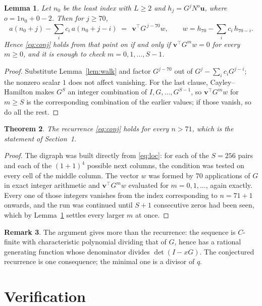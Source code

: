\documentclass[11pt,a4paper]{article}
\theoremstyle{plain}
\newtheorem{theorem}{Theorem}
\newtheorem{lemma}[theorem]{Lemma}
\theoremstyle{definition}
\newtheorem{remark}[theorem]{Remark}
\begin{document}
\begin{lemma}\label{lem:crit}
Let $n_0$ be the least index with $L\ge2$ and $h_j=G^{j}N^{o}\mathbf{u}$, where
$o=1n_0+0-2$. Then for $j\ge70$,
\[
a(n_0+j)-\sum_i c_i\,a(n_0+j-i)\;=\;\,\mathbf{v}^{\!\top}G^{\,j-70}w,
\qquad w=h_{70}-\sum_i c_i\,h_{70-i} .
\]
Hence \eqref{eq:conj} holds from that point on if and only if
$\mathbf{v}^{\!\top}G^{m}w=0$ for every $m\ge0$, and it is enough to check
$m=0,1,\dots,S-1$.
\end{lemma}

\begin{proof}
Substitute Lemma~\ref{lem:walk} and factor $G^{j-70}$ out of
$G^{j}-\sum_ic_iG^{j-i}$; the nonzero scalar $1$ does not affect
vanishing. For the last clause, Cayley--Hamilton makes $G^{S}$ an integer combination of
$I,G,\dots,G^{S-1}$, so $\mathbf{v}^{\!\top}G^{m}w$ for $m\ge S$ is the corresponding
combination of the earlier values; if those vanish, so do all the rest.
\end{proof}

\begin{theorem}
The recurrence \eqref{eq:conj} holds for every $n>71$, which is the statement of
Section~1.
\end{theorem}

\begin{proof}
The digraph was built directly from \eqref{eq:loc}: for each of the $S=256$ pairs and each
of the $(1+1)^{4}$ possible next columns, the condition was tested on every cell of
the middle column. The vector $w$ was formed by $70$ applications of $G$ in exact integer
arithmetic and $\mathbf{v}^{\!\top}G^{m}w$ evaluated for $m=0,1,\dots$, again exactly.
Every one of those integers vanishes from the index corresponding to $n=71+1$ onwards,
and the run was continued until $S+1$ consecutive zeros had been seen, which by
Lemma~\ref{lem:crit} settles every larger $m$ at once.
\end{proof}

\begin{remark}
The argument gives more than the recurrence: the sequence is $C$-finite with characteristic
polynomial dividing that of $G$, hence has a rational generating function whose denominator
divides $\det(I-xG)$. The conjectured recurrence is one consequence; the minimal one is a
divisor of $q$.
\end{remark}

\section{Verification}
\end{document}
